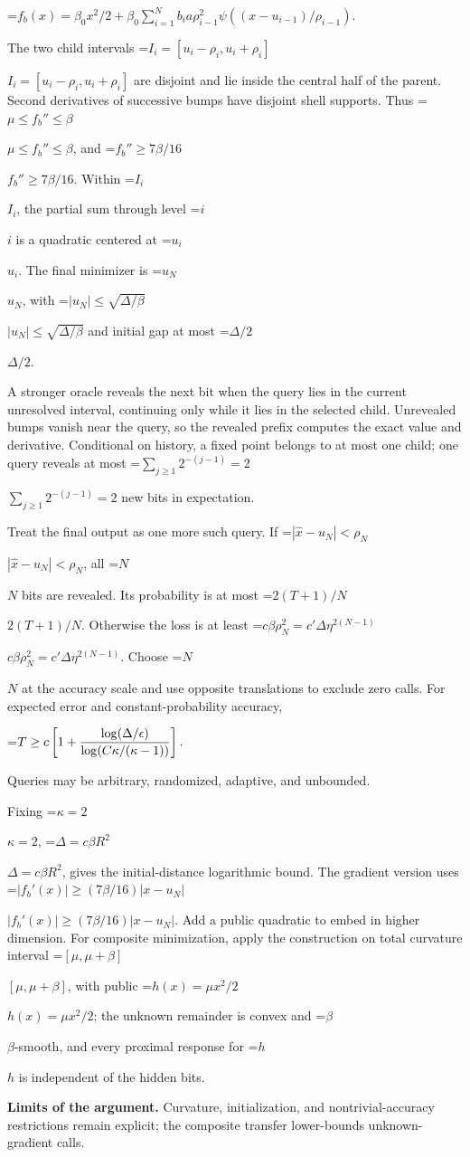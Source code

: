 \documentclass[10pt,a4paper]{article}
\newcommand{\AtlasMath}[1]{\par\begingroup\centering\setbox0=\hbox{$\displaystyle #1$}\ifdim\wd0>1.4\linewidth\typeout{ATLAS WIDE FORMULA: \the\wd0}\fi\ifdim\wd0>\linewidth\resizebox{\linewidth}{!}{\box0}\else\box0\fi\par\endgroup}
\newcommand{\AtlasInlineMath}[1]{\begingroup\setbox0=\hbox{$#1$}\ifdim\wd0>.4\linewidth\endgroup\AtlasMath{#1}\else\endgroup$#1$\fi}
\begin{document}
\AtlasMath{f_b(x)=\beta_0x^2/2+
\beta_0\sum_{i=1}^N b_i a\rho_{i-1}^2
\psi((x-u_{i-1})/\rho_{i-1}).}

The two child intervals \AtlasInlineMath{I_i=[u_i-\rho_i,u_i+\rho_i]} are disjoint and lie inside the central half of the parent. Second derivatives of successive bumps have disjoint shell supports. Thus \AtlasInlineMath{\mu\le f_b''\le\beta}, and \AtlasInlineMath{f_b''\ge7\beta/16}. Within \AtlasInlineMath{I_i}, the partial sum through level \AtlasInlineMath{i} is a quadratic centered at \AtlasInlineMath{u_i}. The final minimizer is \AtlasInlineMath{u_N}, with \AtlasInlineMath{|u_N|\le\sqrt{\Delta/\beta}} and initial gap at most \AtlasInlineMath{\Delta/2}.

A stronger oracle reveals the next bit when the query lies in the current unresolved interval, continuing only while it lies in the selected child. Unrevealed bumps vanish near the query, so the revealed prefix computes the exact value and derivative. Conditional on history, a fixed point belongs to at most one child; one query reveals at most \AtlasInlineMath{\sum_{j\ge1}2^{-(j-1)}=2} new bits in expectation.

Treat the final output as one more such query. If \AtlasInlineMath{|\widehat x-u_N|<\rho_N}, all \AtlasInlineMath{N} bits are revealed. Its probability is at most \AtlasInlineMath{2(T+1)/N}. Otherwise the loss is at least
\AtlasInlineMath{c\beta\rho_N^2=c'\Delta\eta^{2(N-1)}}.
Choose \AtlasInlineMath{N} at the accuracy scale and use opposite translations to exclude zero calls. For expected error and constant-probability accuracy,

\AtlasMath{T\ge c\left[1+{\log(\Delta/\epsilon)\over
\log(C\kappa/(\kappa-1))}\right].}

Queries may be arbitrary, randomized, adaptive, and unbounded.

Fixing \AtlasInlineMath{\kappa=2}, \AtlasInlineMath{\Delta=c\beta R^2}, gives the initial-distance logarithmic bound. The gradient version uses
\AtlasInlineMath{|f_b'(x)|\ge(7\beta/16)|x-u_N|}.
Add a public quadratic to embed in higher dimension. For composite minimization, apply the construction on total curvature interval \AtlasInlineMath{[\mu,\mu+\beta]}, with public \AtlasInlineMath{h(x)=\mu x^2/2}; the unknown remainder is convex and \AtlasInlineMath{\beta}-smooth, and every proximal response for \AtlasInlineMath{h} is independent of the hidden bits.

\textbf{Limits of the argument.} Curvature, initialization, and nontrivial-accuracy restrictions remain explicit; the composite transfer lower-bounds unknown-gradient calls.
\end{document}
